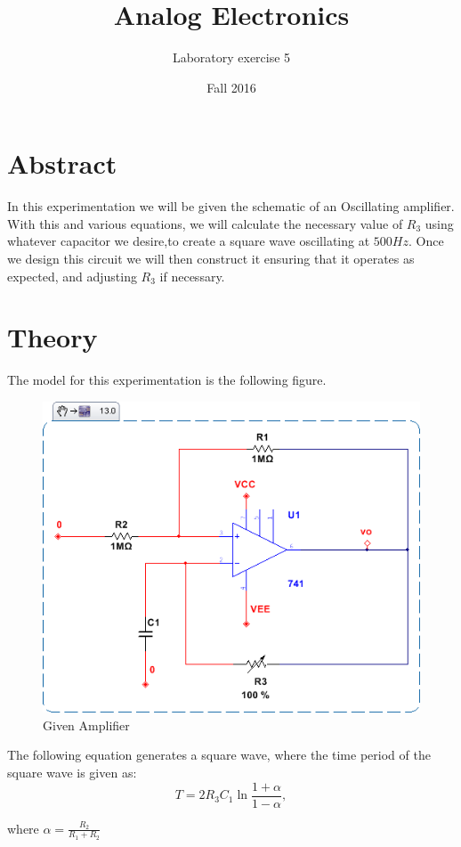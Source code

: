 \documentclass[12pt]{article}
\begin{document}
\title{Analog Electronics}
\author{Laboratory exercise 5}
\date{Fall 2016}
\maketitle

\newpage
\section{Abstract}

In this experimentation we will be given the schematic of an Oscillating amplifier. With this and various equations, we will calculate the necessary value of $R_3$ using whatever capacitor we desire,to create a square wave oscillating at $500Hz$. Once we design this circuit we will then construct it ensuring that it operates as expected, and adjusting $R_3$ if necessary.

\section{Theory}
The model for this experimentation is the following figure.
\begin{figure}[h]
	\label{fig:amp}
	\caption{Given Amplifier}
	\centering
	\includegraphics[width=1\textwidth]{opamp_oscillator}
\end{figure}

The following equation generates a square wave, where the time period of the square wave is given as:
$$ T = 2R_3C_1 \ln{\frac{1+\alpha}{1-\alpha}}, $$
\begin{center}
	 where $\alpha = \frac{R_2}{R_1 + R_2}$
\end{center}
\end{document}
